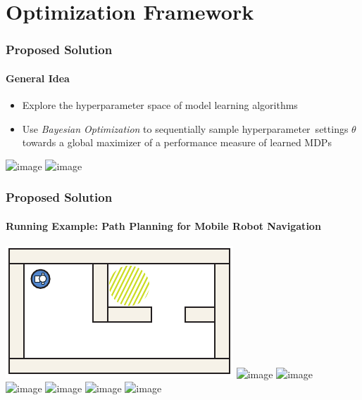 \section{Optimization Framework}

\begin{frame}[t]
\frametitle{Proposed Solution}
\framesubtitle{General Idea}

\begin{itemize}
	\item<1-> Explore the hyperparameter space of model learning algorithms
	\item<2-> Use \textit{Bayesian Optimization} to sequentially sample hyperparameter~settings $\theta$ towards a global maximizer of a performance measure of learned MDPs
\end{itemize}

\begin{center}
	\includegraphics<-2|handout:0>[width=\textwidth]{figures/bo_toy_example_v2_transparent}
	\includegraphics<3->[width=\textwidth]{figures/bo_toy_example_v2}
\end{center}

\end{frame}

\begin{frame}
\frametitle{Proposed Solution}
\framesubtitle{Running Example: Path Planning for Mobile Robot Navigation}

\centering
\includegraphics[width=.3\textwidth]{figures/dummy-map-2-1}
\qquad
\includegraphics<-1| handout:0>[width=.3\textwidth]{figures/dummy-map-2-2-transparent}
\includegraphics<2->[width=.3\textwidth]{figures/dummy-map-2-2v2}\\\vspace{8pt}
\includegraphics<-2| handout:0>[width=.3\textwidth]{figures/dummy-map-2-3-transparent}
\includegraphics<3->[width=.3\textwidth]{figures/dummy-map-2-3} \qquad
\includegraphics<-3| handout:0>[width=.3\textwidth]{figures/dummy-map-2-4-transparent} \includegraphics<4->[width=.3\textwidth]{figures/dummy-map-2-4}


\end{frame}


